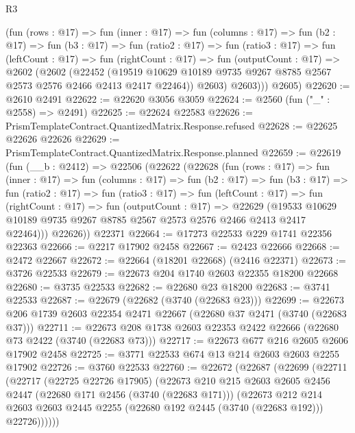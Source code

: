\begin{lexlean}{R3}
\begin{coremodule}
          (fun (rows : @17) =>
          fun (inner : @17) =>
          fun (columns : @17) =>
          fun (b2 : @17) =>
          fun (b3 : @17) =>
          fun (ratio2 : @17) =>
          fun (ratio3 : @17) =>
          fun (leftCount : @17) =>
          fun (rightCount : @17) =>
          fun (outputCount : @17) =>
          @2602
            (@2602
              (@22452
                (@19519 @10629 @10189 @9735 @9267 @8785 @2567 @2573 @2576 @2466 @2413 @2417 @22464))
              @2603)
            @2603)))
      @2605)
@22620 := @2610 @2491
@22622 := @22620 @3056 @3059
@22624 := @2560 (fun ("_" : @2558) => @2491)
@22625 := @22624 @22583
@22626 := PrismTemplateContract.QuantizedMatrix.Response.refused
@22628 := @22625 @22626 @22626
@22629 := PrismTemplateContract.QuantizedMatrix.Response.planned
@22659 := @22619
    (fun (__b : @2412) =>
    @22506
      (@22622
        (@22628
          (fun (rows : @17) =>
          fun (inner : @17) =>
          fun (columns : @17) =>
          fun (b2 : @17) =>
          fun (b3 : @17) =>
          fun (ratio2 : @17) =>
          fun (ratio3 : @17) =>
          fun (leftCount : @17) =>
          fun (rightCount : @17) =>
          fun (outputCount : @17) =>
          @22629
            (@19533 @10629 @10189 @9735 @9267 @8785 @2567 @2573 @2576 @2466 @2413 @2417 @22464)))
        @22626))
    @22371
@22664 := @17273 @22533 @229 @1741 @22356 @22363
@22666 := @2217 @17902 @2458
@22667 := @2423 @22666
@22668 := @2472 @22667
@22672 := @22664 (@18201 @22668) (@2416 @22371)
@22673 := @3726 @22533
@22679 := @22673 @204 @1740 @2603 @22355 @18200 @22668
@22680 := @3735 @22533
@22682 := @22680 @23 @18200
@22683 := @3741 @22533
@22687 := @22679 (@22682 (@3740 (@22683 @23)))
@22699 := @22673 @206 @1739 @2603 @22354 @2471 @22667 (@22680 @37 @2471 (@3740 (@22683 @37)))
@22711 := @22673 @208 @1738 @2603 @22353 @2422 @22666 (@22680 @73 @2422 (@3740 (@22683 @73)))
@22717 := @22673 @677 @216 @2605 @2606 @17902 @2458
@22725 := @3771 @22533 @674 @13 @214 @2603 @2603 @2255 @17902
@22726 := @3760 @22533
@22760 := @22672
    (@22687
      (@22699
        (@22711
          (@22717
            (@22725 @22726 @17905)
            (@22673
              @210
              @215
              @2603
              @2605
              @2456
              @2447
              (@22680 @171 @2456 (@3740 (@22683 @171)))
              (@22673
                @212
                @214
                @2603
                @2603
                @2445
                @2255
                (@22680 @192 @2445 (@3740 (@22683 @192)))
                @22726))))))

\end{coremodule}
\end{lexlean}

